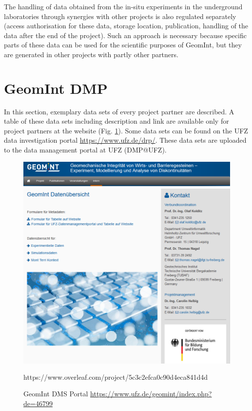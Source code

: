 The handling of data obtained from the in-situ experiments in the underground laboratories through synergies with other projects is also regulated separately (access authorisation for these data, storage location, publication, handling of the data after the end of the project). Such an approach is necessary because specific parts of these data can be used for the scientific purposes of GeomInt, but they are generated in other projects with partly other partners.

\section{GeomInt DMP}

In this section, exemplary data sets of every project partner are described. A table of these data sets including description and link are available only for project partners at the website (Fig. \ref{fig:geomint-dms-web}). Some data sets can be found on the UFZ data investigation portal \url{https://www.ufz.de/drp/}. These data sets are uploaded to the data management portal at UFZ (DMP@UFZ).

\begin{figure}[!ht]
\includegraphics[width=\textwidth]{figures/geomint-web-01.png}
\includegraphics[width=\textwidth]{figures/geomint-dms-01.png}
\caption{GeomInt DMS Portal \url{https://www.ufz.de/geomint/index.php?de=46799}}
\label{fig:geomint-dms-web}https://www.overleaf.com/project/5c3c2efca0c90d4eca841d4d
\end{figure}

